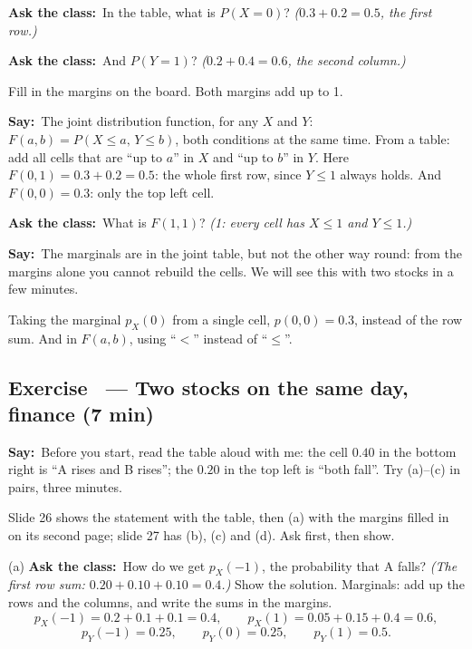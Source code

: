 \documentclass[11pt,a4paper,parskip=half]{scrartcl}
\renewcommand{\needspace}[1]{\Needspace{6\baselineskip}}
\newcommand{\say}{\textbf{\color{teal}Say:}\ }
\newcommand{\ask}{\textbf{\color{navy}Ask the class:}\ }
\begin{document}
\ask In the table, what is $P(X=0)$? \emph{($0.3+0.2=0.5$, the first
row.)}

\ask And $P(Y=1)$? \emph{($0.2+0.4=0.6$, the second column.)}

Fill in the margins on the board. Both margins add up to 1.

\say The joint distribution function, for any $X$ and $Y$:
$F(a,b)=P(X\le a,\,Y\le b)$, both conditions at the same time. From a
table: add all cells that are ``up to $a$'' in $X$ and ``up to $b$'' in
$Y$. Here $F(0,1)=0.3+0.2=0.5$: the whole first row, since $Y\le1$ always
holds. And $F(0,0)=0.3$: only the top left cell.

\ask What is $F(1,1)$? \emph{(1: every cell has $X\le1$ and $Y\le1$.)}

\say The marginals are in the joint table, but not the other way round:
from the margins alone you cannot rebuild the cells. We will see this
with two stocks in a few minutes.

\begin{mistake}
	Taking the marginal $p_X(0)$ from a single cell, $p(0,0)=0.3$, instead
	of the row sum. And in $F(a,b)$, using ``$<$'' instead of ``$\le$''.
\end{mistake}

\needspace{0.25\textheight}
\subsection{Exercise~ --- Two stocks on the same day, finance (7 min)}


\say Before you start, read the table aloud with me: the cell $0.40$ in
the bottom right is ``A rises and B rises''; the $0.20$ in the top left is
``both fall''. Try (a)--(c) in pairs, three minutes.

\begin{slidecue}
	Slide 26 shows the statement with the table, then (a) with the margins
	filled in on its second page; slide 27 has (b), (c) and (d). Ask first,
	then show.
\end{slidecue}

(a) \ask How do we get $p_X(-1)$, the probability that A falls? \emph{(The
first row sum: $0.20+0.10+0.10=0.4$.)} Show the solution. Marginals: add
up the rows and the columns, and write the sums in the margins.
\[ p_X(-1)=0.2+0.1+0.1=0.4,\qquad p_X(1)=0.05+0.15+0.4=0.6, \]
\[ p_Y(-1)=0.25,\qquad p_Y(0)=0.25,\qquad p_Y(1)=0.5. \]
\end{document}
